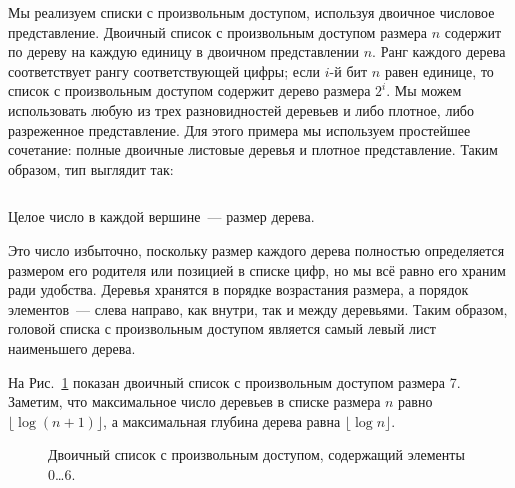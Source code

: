 \begin{frame}[fragile]{}
Мы реализуем списки с произвольным доступом, используя двоичное
числовое представление. Двоичный список с произвольным доступом
размера $n$ содержит по дереву на каждую единицу в двоичном
представлении $n$. Ранг каждого дерева соответствует рангу
соответствующей цифры; если $i$-й бит $n$ равен единице, то список с
произвольным доступом содержит дерево размера $2^i$. Мы можем
использовать любую из трех разновидностей деревьев и либо плотное,
либо разреженное представление. Для этого примера мы используем
простейшее сочетание: полные двоичные листовые деревья и плотное
представление. Таким образом, тип  выглядит так:

\inputminted[firstline=7,lastline=9]{haskell}{code/BinaryRandomAccessList.lhs}
\end{frame}

\begin{frame}[fragile]{}

Целое число в каждой вершине~--- размер дерева. 

Это число
избыточно, поскольку размер каждого дерева полностью определяется
размером его родителя или позицией в списке цифр, но мы всё равно его
храним ради удобства. Деревья хранятся в порядке возрастания размера,
а порядок элементов~--- слева направо, как внутри, так и между
деревьями. Таким образом, головой списка с произвольным доступом
является самый левый лист наименьшего дерева. 
\end{frame}

\begin{frame}[fragile]{}
На Рис.~\ref{fig:9.5}
показан двоичный список с произвольным доступом размера 7. Заметим,
что максимальное число деревьев в списке размера $n$ равно
$\lfloor \log (n+1) \rfloor$, а максимальная глубина дерева равна
$\lfloor \log n \rfloor$.



\begin{figure}
  \centering
  
  \caption{Двоичный список с произвольным доступом, содержащий элементы 0\ldots 6.}
  \label{fig:9.5}
\end{figure}
\end{frame}

